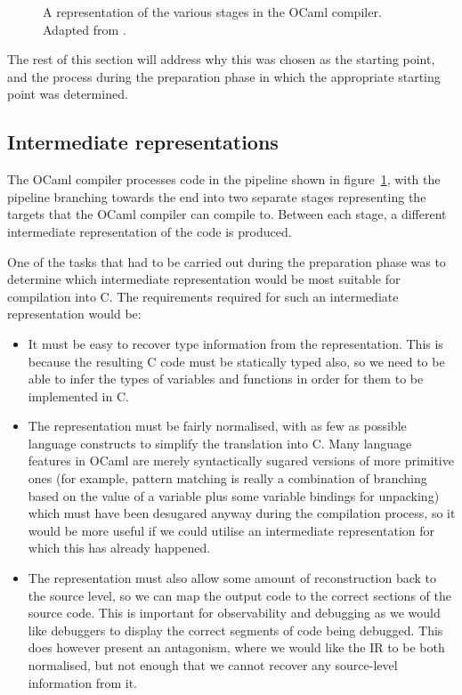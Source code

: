 \begin{figure}
    \centering
    
    \caption{A representation of the various stages in the OCaml compiler. 
    Adapted from \cite[Chapter~22]{realworldocaml}.}
    \label{fig:compilerstages}
\end{figure}

The rest of this section will address why this was chosen as the starting 
point, and the process during the preparation phase in which the appropriate 
starting point was determined.

\subsection{Intermediate representations}

The OCaml compiler processes code in the pipeline shown in
figure~\ref{fig:compilerstages}, with the pipeline branching towards the end
into two separate stages representing the targets that the OCaml compiler can
compile to. Between each stage, a different intermediate representation of the
code is produced.

One of the tasks that had to be carried out during the preparation phase was 
to determine which intermediate representation would be most suitable for 
compilation into C. The requirements required for such an intermediate 
representation would be:

\begin{itemize}

\item It must be easy to recover type information from the representation. This
    is because the resulting C code must be statically typed also, so we need to
    be able to infer the types of variables and functions in order for them to
    be implemented in C.

\item The representation must be fairly normalised, with as few as possible
    language constructs to simplify the translation into C. Many language
    features in OCaml are merely syntactically sugared versions of more
    primitive ones (for example, pattern matching is really a combination of
    branching based on the value of a variable plus some variable bindings for
    unpacking) which must have been desugared anyway during the compilation
    process, so it would be more useful if we could utilise an intermediate
    representation for which this has already happened.

\item The representation must also allow some amount of reconstruction back to
    the source level, so we can map the output code to the correct sections of
    the source code. This is important for observability and debugging as we
    would like debuggers to display the correct segments of code being debugged.
    This does however present an antagonism, where we would like the IR to be
    both normalised, but not enough that we cannot recover any source-level
    information from it.

\end{itemize}


